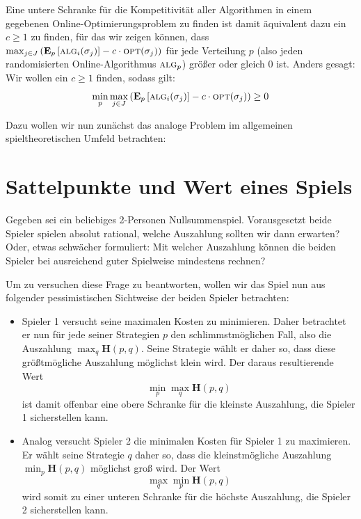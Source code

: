 \documentclass[a4paper,ngerman,12pt,bibtotoc]{scrartcl}
\theoremstyle{definition}
\theoremstyle{plain}
\theoremstyle{remark}
\renewcommand{\_}{\mathpunct{.}\,}
\newcommand{\?}{\,{:}\,}
\newcommand{\Alg}{\ensuremath{\textsc{alg}}}
\newcommand{\Opt}{\ensuremath{\textsc{opt}}}
\newcommand{\EE}{\mathbf{E}}
\newcommand{\EH}{\boldsymbol{H}}
\begin{document}
	Eine untere Schranke für die Kompetitivität aller Algorithmen in einem gegebenen Online-Optimierungsproblem zu finden ist damit äquivalent dazu ein $c\geq 1$ zu finden, für das wir zeigen können, dass $\max_{j\in J}\left(\EE_{p}\left[\Alg_i(\sigma_j)\right] - c\cdot\Opt(\sigma_j)\right)$ für jede Verteilung $p$ (also jeden randomisierten Online-Algorithmus $\Alg_p$) größer oder gleich 0 ist. Anders gesagt: Wir wollen ein $c\geq 1$ finden, sodass gilt:
	\begin{equation}\label{eq:untereSchranke}
		\min_p\max_{j\in J}\left(\EE_{p}\left[\Alg_i(\sigma_j)\right] - c\cdot\Opt(\sigma_j)\right) \geq 0
	\end{equation}
	
	Dazu wollen wir nun zunächst das analoge Problem im allgemeinen spieltheoretischen Umfeld betrachten:
	
	
	\section{Sattelpunkte und Wert eines Spiels}
	
	Gegeben sei ein beliebiges 2-Personen Nullsummenspiel. Vorausgesetzt beide Spieler spielen absolut rational, welche Auszahlung sollten wir dann erwarten? Oder, etwas schwächer formuliert: Mit welcher Auszahlung können die beiden Spieler bei ausreichend guter Spielweise mindestens rechnen?
	
	Um zu versuchen diese Frage zu beantworten, wollen wir das Spiel nun aus folgender \glqq pessimistischen\grqq{} Sichtweise der beiden Spieler betrachten:
	\begin{itemize}
		\item Spieler 1 versucht seine maximalen Kosten zu minimieren. Daher betrachtet er nun für jede seiner Strategien $p$ den schlimmstmöglichen Fall, also die Auszahlung $\max_q \EH(p,q)$. Seine Strategie wählt er daher so, dass diese größtmögliche Auszahlung möglichst klein wird. Der daraus resultierende Wert
			\[\min_p \max_q \EH(p,q)\]
		ist damit offenbar eine obere Schranke für die kleinste Auszahlung, die Spieler 1 sicherstellen kann.
		\item Analog versucht Spieler 2 die minimalen Kosten für Spieler 1 zu maximieren. Er wählt seine Strategie $q$ daher so, dass die kleinstmögliche Auszahlung $\min_p \EH(p,q)$ möglichst groß wird. Der Wert
			\[\max_q \min_p \EH(p,q)\]
		wird somit zu einer unteren Schranke für die höchste Auszahlung, die Spieler 2 sicherstellen kann.
	\end{itemize}
	
\end{document}
